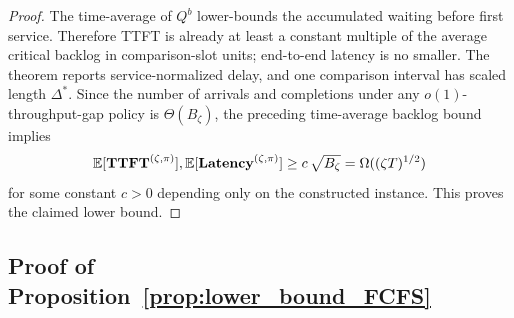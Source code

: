 \begin{proof}
The time-average of \(Q^b\) lower-bounds the accumulated waiting before first service. Therefore TTFT is already at least a constant multiple of the average critical backlog in comparison-slot units; end-to-end latency is no smaller. The theorem reports service-normalized delay, and one comparison interval has scaled length \(\Delta^*\). Since the number of arrivals and completions under any \(o(1)\)-throughput-gap policy is \(\Theta(B_\zeta)\), the preceding time-average backlog bound implies
\[
    \mathbb{E}[\textbf{TTFT}^{(\zeta,\pi)}],
    \mathbb{E}[\textbf{Latency}^{(\zeta,\pi)}]
    \ge
    c\,\sqrt{B_\zeta}
    =
    \Omega((\zeta T)^{1/2})
\]
for some constant \(c>0\) depending only on the constructed instance. This proves the claimed lower bound.
\end{proof}

\subsection{Proof of Proposition~\ref{prop:lower_bound_FCFS}}
\label{appendix:proof_fcfs_lower_bound}

